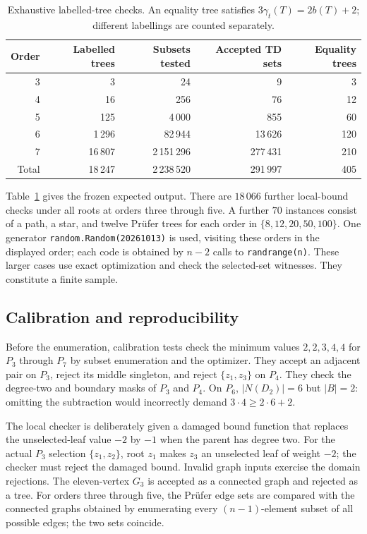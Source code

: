 \documentclass[11pt,a4paper]{article}
\theoremstyle{remark}
\newcommand{\td}{\gamma_t}
\newcommand{\BB}{B}
\begin{document}
\begin{table}[htbp]
\centering
\small
\setlength{\tabcolsep}{6pt}
\begin{tabular}{@{}rrrrr@{}}
\toprule
Order & Labelled trees & Subsets tested & Accepted TD sets & Equality trees\\
\midrule
3 & 3 & 24 & 9 & 3\\
4 & 16 & 256 & 76 & 12\\
5 & 125 & 4\,000 & 855 & 60\\
6 & 1\,296 & 82\,944 & 13\,626 & 120\\
7 & 16\,807 & 2\,151\,296 & 277\,431 & 210\\
\midrule
Total & 18\,247 & 2\,238\,520 & 291\,997 & 405\\
\bottomrule
\end{tabular}
\caption{Exhaustive labelled-tree checks. An equality tree satisfies
$3\td(T)=2b(T)+2$; different labellings are counted separately.}
\label{tab:counts}
\end{table}

Table~\ref{tab:counts} gives the frozen expected output.
There are $18\,066$ further local-bound checks under all roots at
orders three through five. A further $70$ instances consist of a
path, a star, and twelve Pr\"ufer trees for each order in
$\{8,12,20,50,100\}$. One generator \texttt{random.Random(20261013)}
is used, visiting these orders in the displayed order; each code is
obtained by $n-2$ calls to \texttt{randrange(n)}. These larger cases
use exact optimization and check the selected-set witnesses.
They constitute a finite sample.

\subsection{Calibration and reproducibility}

Before the enumeration, calibration tests check the minimum values
$2,2,3,4,4$ for $P_3$ through $P_7$ by subset enumeration and the
optimizer. They accept an adjacent pair on $P_3$, reject its middle
singleton, and reject $\{z_1,z_3\}$ on $P_4$. They check the
degree-two and boundary masks of $P_3$ and $P_4$. On $P_6$,
$|N(D_2)|=6$ but $|\BB|=2$: omitting the subtraction would
incorrectly demand $3\cdot 4\ge 2\cdot 6+2$.

The local checker is deliberately given a damaged bound function
that replaces the unselected-leaf value $-2$ by $-1$ when the parent
has degree two. For the actual $P_3$ selection $\{z_1,z_2\}$, root
$z_1$ makes $z_3$ an unselected leaf of weight $-2$; the checker
must reject the damaged bound. Invalid graph inputs exercise the
domain rejections. The eleven-vertex $G_3$ is accepted as a connected
graph and rejected as a tree. For orders three through five, the
Pr\"ufer edge sets are compared with the connected graphs obtained
by enumerating every $(n-1)$-element subset of all possible edges;
the two sets coincide.
\end{document}

